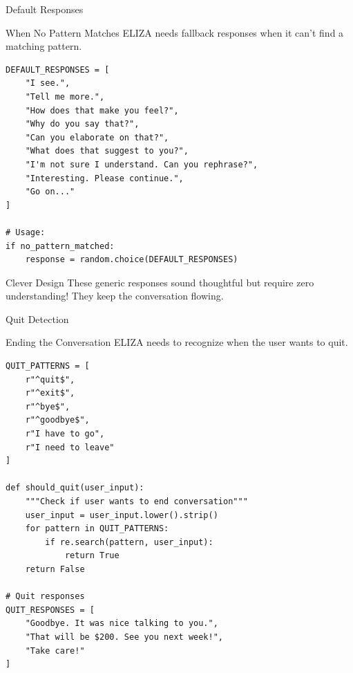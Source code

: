 \documentclass[aspectratio=169]{beamer}
\begin{document}
\begin{frame}[fragile]{Default Responses 🎲}
\begin{block}{When No Pattern Matches}
ELIZA needs fallback responses when it can't find a matching pattern.
\end{block}

\vspace{0.3cm}

\begin{lstlisting}
DEFAULT_RESPONSES = [
    "I see.",
    "Tell me more.",
    "How does that make you feel?",
    "Why do you say that?",
    "Can you elaborate on that?",
    "What does that suggest to you?",
    "I'm not sure I understand. Can you rephrase?",
    "Interesting. Please continue.",
    "Go on..."
]

# Usage:
if no_pattern_matched:
    response = random.choice(DEFAULT_RESPONSES)
\end{lstlisting}

\vspace{0.3cm}

\begin{alertblock}{Clever Design}
These generic responses sound thoughtful but require zero understanding! They keep the conversation flowing.
\end{alertblock}
\end{frame}

\begin{frame}[fragile]{Quit Detection 🚪}
\begin{block}{Ending the Conversation}
ELIZA needs to recognize when the user wants to quit.
\end{block}

\vspace{0.3cm}

\begin{lstlisting}
QUIT_PATTERNS = [
    r"^quit$",
    r"^exit$",
    r"^bye$",
    r"^goodbye$",
    r"I have to go",
    r"I need to leave"
]

def should_quit(user_input):
    """Check if user wants to end conversation"""
    user_input = user_input.lower().strip()
    for pattern in QUIT_PATTERNS:
        if re.search(pattern, user_input):
            return True
    return False

# Quit responses
QUIT_RESPONSES = [
    "Goodbye. It was nice talking to you.",
    "That will be $200. See you next week!",
    "Take care!"
]
\end{lstlisting}
\end{frame}
\end{document}
